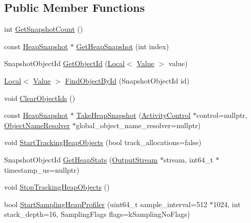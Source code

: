 \subsection*{Public Member Functions}
\begin{DoxyCompactItemize}
\item 
int \mbox{\hyperlink{classv8_1_1HeapProfiler_a24830775a0ab938eb0a29ed8f3dfd265}{Get\+Snapshot\+Count}} ()
\item 
const \mbox{\hyperlink{classv8_1_1HeapSnapshot}{Heap\+Snapshot}} $\ast$ \mbox{\hyperlink{classv8_1_1HeapProfiler_af9093f6ca6e5558315f354c7ccb55484}{Get\+Heap\+Snapshot}} (int index)
\item 
Snapshot\+Object\+Id \mbox{\hyperlink{classv8_1_1HeapProfiler_ab926a1f1ed95b731d4ef3133e67eef19}{Get\+Object\+Id}} (\mbox{\hyperlink{classv8_1_1Local}{Local}}$<$ \mbox{\hyperlink{classv8_1_1Value}{Value}} $>$ value)
\item 
\mbox{\hyperlink{classv8_1_1Local}{Local}}$<$ \mbox{\hyperlink{classv8_1_1Value}{Value}} $>$ \mbox{\hyperlink{classv8_1_1HeapProfiler_ace729f9b7dbb2ca8b2fd67551bf5aae8}{Find\+Object\+By\+Id}} (Snapshot\+Object\+Id id)
\item 
void \mbox{\hyperlink{classv8_1_1HeapProfiler_a8a90c630543ed1875cbf9166239ff8d3}{Clear\+Object\+Ids}} ()
\item 
const \mbox{\hyperlink{classv8_1_1HeapSnapshot}{Heap\+Snapshot}} $\ast$ \mbox{\hyperlink{classv8_1_1HeapProfiler_a9df0b9a5dedcfc0ac796724cca36e7d7}{Take\+Heap\+Snapshot}} (\mbox{\hyperlink{classv8_1_1ActivityControl}{Activity\+Control}} $\ast$control=nullptr, \mbox{\hyperlink{classv8_1_1HeapProfiler_1_1ObjectNameResolver}{Object\+Name\+Resolver}} $\ast$global\+\_\+object\+\_\+name\+\_\+resolver=nullptr)
\item 
void \mbox{\hyperlink{classv8_1_1HeapProfiler_a02917db133b7efd468c9c73075a15171}{Start\+Tracking\+Heap\+Objects}} (bool track\+\_\+allocations=false)
\item 
Snapshot\+Object\+Id \mbox{\hyperlink{classv8_1_1HeapProfiler_add093717acd067daeddb7ef5fc8b191a}{Get\+Heap\+Stats}} (\mbox{\hyperlink{classv8_1_1OutputStream}{Output\+Stream}} $\ast$stream, int64\+\_\+t $\ast$timestamp\+\_\+us=nullptr)
\item 
void \mbox{\hyperlink{classv8_1_1HeapProfiler_ae448d9474ae34781133d4a4547b08cb1}{Stop\+Tracking\+Heap\+Objects}} ()
\item 
bool \mbox{\hyperlink{classv8_1_1HeapProfiler_a6b9450bbf1f4e1a4909df92d4df4a174}{Start\+Sampling\+Heap\+Profiler}} (uint64\+\_\+t sample\+\_\+interval=512 $\ast$1024, int stack\+\_\+depth=16, Sampling\+Flags flags=k\+Sampling\+No\+Flags)

\end{DoxyCompactItemize}
